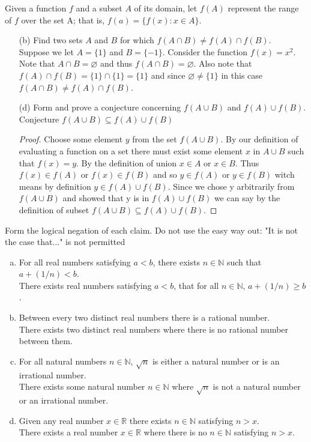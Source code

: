 \documentclass[12pt]{article}
\makeatletter
\theoremstyle{homework}
\newenvironment{exercise}[1]
{\def\@currentlabel{#1}\exercisecore}
{\endexercisecore}
\newcommand{\Reals}{\ensuremath{\mathbb R}}
\newcommand{\Nats}{\ensuremath{\mathbb N}}
\makeatother
\begin{document}
\begin{exercise}{1.2.6(b), (d)}
Given a function $f$ and a subset $A$ of its domain, let $f(A)$ represent the range of $f$ over the set A;
that is, $f(a)=\{f(x):x\in A\}$.
\end{exercise}
\begin{enumerate}
\item[(b)] Find two sets $A$ and $B$ for which $f(A\cap B) \neq f(A)\cap f(B)$.\\
Suppose we let $A=\{1\}$ and $B=\{-1\}$.  Consider the function $f(x)=x^2$.  Note that $A\cap B=\varnothing$ and thus $f(A\cap B)=\varnothing$.  Also note that $f(A)\cap f(B)=\{1\}\cap \{1\}=\{1\}$ and since $\varnothing \neq \{1\}$ in this case $f(A\cap B) \neq f(A)\cap f(B)$.
\item[(d)] Form and prove a conjecture concerning $f(A\cup B)$ and $f(A)\cup f(B)$.\\
Conjecture $f(A\cup B) \subseteq f(A)\cup f(B)$
\begin{proof}
Choose some element $y$ from the set $f(A\cup B)$.  By our definition of evaluating a function on a set there must exist some element $x$ in $A\cup B$ such that $f(x)=y$.  By the definition of union $x\in A$ or $x\in B$.  Thus $f(x)\in f(A)$ or $f(x)\in f(B)$ and so $y\in f(A)$ or $y\in f(B)$ witch means by definition $y\in f(A)\cup f(B)$.  Since we chose y arbitrarily from $f(A\cup B)$ and showed that y is in $f(A)\cup f(B)$ we can say by the definition of subset $f(A\cup B) \subseteq f(A)\cup f(B)$.
\end{proof}
\end{enumerate}

\begin{exercise}{1.2.8}
Form the logical negation of each claim. Do not use the easy way out: "It is not the case that$\ldots$" 
is not permitted
\begin{enumerate}[(a)]
\item For all real numbers satisfying $a<b$, there exists $n\in\Nats$ such that $a+(1/n)<b$.\\
There exists real numbers satisfying $a<b$, that for all $n\in\Nats$,  $a+(1/n)\ge b$.
\item Between every two distinct real numbers there is a rational number.\\
There exists two distinct real numbers where there is no rational number between them.
\item For all natural numbers $n\in\Nats$, $\sqrt{n}$ is either a natural number or is an
irrational number.\\
There exists some natural number $n\in\Nats$ where $\sqrt{n}$ is not a natural number or an
irrational number.
\item Given any real number $x\in\Reals$ there exists $n\in\Nats$ satisfying $n>x$.\\
There exists a real number $x\in\Reals$ where there is no $n\in\Nats$ satisfying $n>x$.
\end{enumerate}
\end{exercise}
\end{document}
